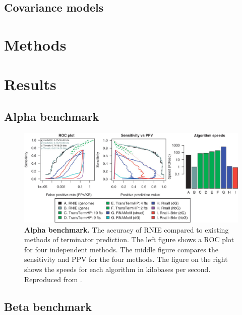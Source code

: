 \subsection{Covariance models}

\section{Methods}

\section{Results}
\subsection{Alpha benchmark}

\begin{figure}[htp]
\begin{center}
\includegraphics[width=14cm]{alpha.jpg}
\caption[Alpha benchmark]{\textbf{Alpha benchmark.} The accuracy of RNIE compared to existing methods of terminator prediction. The left figure shows a ROC plot for four independent methods. The middle figure compares the sensitivity and PPV for the four methods. The figure on the right shows the speeds for each algorithm in kilobases per second. Reproduced from \textcite{Gardner2011a}.
} 
\label{fig:alpha}
\end{center}
\end{figure}

\subsection{Beta benchmark}

